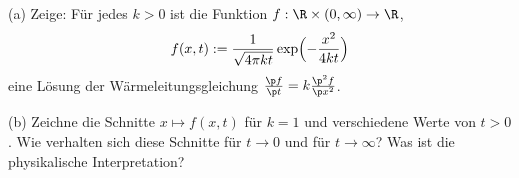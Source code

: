 \begin{prob}
(a) Zeige: F\"ur jedes $k>0$ ist die Funktion $f:\R\times(0,\infty)\to\R$,
$$
   f(x,t) := \frac{1}{\sqrt{4\pi k t}}\exp\Bigl(-\frac{x^2}{4kt}\Bigr)
$$
eine L\"osung der W\"armeleitungsgleichung $\frac{\p f}{\p
  t}=k\frac{\p^2f}{\p x^2}$.

(b) Zeichne die Schnitte $x\mapsto f(x,t)$ f\"ur $k=1$ und
verschiedene Werte von $t>0$. Wie verhalten sich diese Schnitte
f\"ur $t\to 0$ und f\"ur $t\to\infty$? Was ist die physikalische
Interpretation? 
\end{prob}
